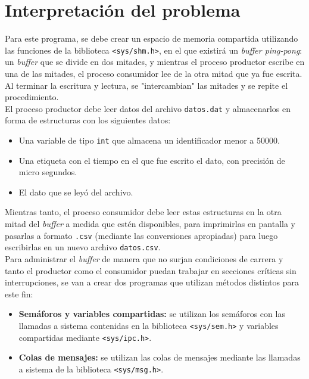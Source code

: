\section{Interpretación del problema}
Para este programa, se debe crear un espacio de memoria compartida utilizando las funciones de la biblioteca \texttt{<sys/shm.h>}, en el que existirá un \textit{buffer ping-pong}: un \textit{buffer} que se divide en dos mitades, y mientras el proceso productor escribe en una de las mitades, el proceso consumidor lee de la otra mitad que ya fue escrita. Al terminar la escritura y lectura, se "intercambian" las mitades y se repite el procedimiento.\\

El proceso productor debe leer datos del archivo \texttt{datos.dat} y almacenarlos en forma de estructuras con los siguientes datos:\\

\begin{itemize}
    \item Una variable de tipo \texttt{int} que almacena un identificador menor a 50000.
    \item Una etiqueta con el tiempo en el que fue escrito el dato, con precisión de micro segundos.
    \item El dato que se leyó del archivo.\\
\end{itemize}

Mientras tanto, el proceso consumidor debe leer estas estructuras en la otra mitad del \textit{buffer} a medida que estén disponibles, para imprimirlas en pantalla y pasarlas a formato \texttt{.csv} (mediante las conversiones apropiadas) para luego escribirlas en un nuevo archivo \texttt{datos.csv}.\\

Para administrar el \textit{buffer} de manera que no surjan condiciones de carrera y tanto el productor como el consumidor puedan trabajar en secciones críticas sin interrupciones, se van a crear dos programas que utilizan métodos distintos para este fin:\\

\begin{itemize}
    \item \textbf{Semáforos y variables compartidas:} se utilizan los semáforos con las llamadas a sistema contenidas en la biblioteca \texttt{<sys/sem.h>} y variables compartidas mediante \texttt{<sys/ipc.h>}.
    \item \textbf{Colas de mensajes:} se utilizan las colas de mensajes mediante las llamadas a sistema de la biblioteca \texttt{<sys/msg.h>}.\\
\end{itemize}